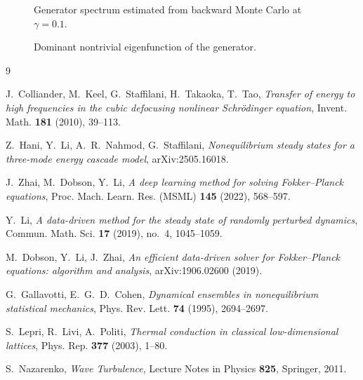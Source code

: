 \documentclass[11pt,a4paper]{article}
\theoremstyle{definition}
\numberwithin{equation}{section}   %
\begin{document}
\begin{figure}[ht]
  \centering
  \caption{Generator spectrum estimated from backward Monte Carlo at
  $\gamma=0.1$.}
  \label{fig:eigenvalues}
\end{figure}

\begin{figure}[ht]
  \centering
  \caption{Dominant nontrivial eigenfunction of the generator.}
  \label{fig:eigenfunction}
\end{figure}


\begin{thebibliography}{9}

J.~Colliander, M.~Keel, G.~Staffilani, H.~Takaoka, T.~Tao,
\emph{Transfer of energy to high frequencies in the cubic defocusing nonlinear
Schr\"odinger equation}, Invent. Math. \textbf{181} (2010), 39--113.

Z.~Hani, Y.~Li, A.~R.~Nahmod, G.~Staffilani,
\emph{Nonequilibrium steady states for a three-mode energy cascade model},
arXiv:2505.16018.

J.~Zhai, M.~Dobson, Y.~Li,
\emph{A deep learning method for solving Fokker--Planck equations},
Proc. Mach. Learn. Res. (MSML) \textbf{145} (2022), 568--597.

Y.~Li,
\emph{A data-driven method for the steady state of randomly perturbed dynamics},
Commun. Math. Sci. \textbf{17} (2019), no.~4, 1045--1059.

M.~Dobson, Y.~Li, J.~Zhai,
\emph{An efficient data-driven solver for Fokker--Planck equations: algorithm
and analysis}, arXiv:1906.02600 (2019).

G.~Gallavotti, E.~G.~D.~Cohen,
\emph{Dynamical ensembles in nonequilibrium statistical mechanics},
Phys. Rev. Lett. \textbf{74} (1995), 2694--2697.

S.~Lepri, R.~Livi, A.~Politi,
\emph{Thermal conduction in classical low-dimensional lattices},
Phys. Rep. \textbf{377} (2003), 1--80.

S.~Nazarenko, \emph{Wave Turbulence}, Lecture Notes in Physics \textbf{825}, Springer, 2011.

\end{thebibliography}
\end{document}
